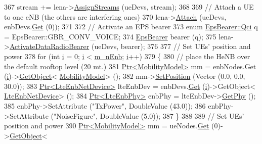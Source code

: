 \begin{DoxyCode}
367   stream += lena->\hyperlink{classns3_1_1LteHelper_ae90d941582aa49a1b28c9301ece35b07}{AssignStreams} (ueDevs, stream);
368   
369   \textcolor{comment}{// Attach a UE to one eNB (the others are interfering ones)}
370   lena->\hyperlink{classns3_1_1LteHelper_a9466743f826aa2652a87907b7f0a1c87}{Attach} (ueDevs, enbDevs.\hyperlink{classns3_1_1NetDeviceContainer_a677d62594b5c9d2dea155cc5045f4d0b}{Get} (0));
371   
372   \textcolor{comment}{// Activate an EPS bearer}
373   \textcolor{keyword}{enum} \hyperlink{structns3_1_1EpsBearer_aecf0c67109c5eb4ec0b07226fff5885e}{EpsBearer::Qci} q = EpsBearer::GBR\_CONV\_VOICE;
374   \hyperlink{structns3_1_1EpsBearer}{EpsBearer} bearer (q);
375   lena->\hyperlink{classns3_1_1LteHelper_ac896e16cf162e4beeaa292d39ab1b700}{ActivateDataRadioBearer} (ueDevs, bearer);
376   
377   \textcolor{comment}{// Set UEs' position and power}
378   \textcolor{keywordflow}{for} (\textcolor{keywordtype}{int} \hyperlink{bernuolliDistribution_8m_a6f6ccfcf58b31cb6412107d9d5281426}{i} = 0; \hyperlink{bernuolliDistribution_8m_a6f6ccfcf58b31cb6412107d9d5281426}{i} < \hyperlink{classLenaDlCtrlPhyErrorModelTestCase_a761b34bd4869ebf6d1a5bd78da392fbb}{m\_nEnb}; \hyperlink{bernuolliDistribution_8m_a6f6ccfcf58b31cb6412107d9d5281426}{i}++)
379     \{
380       \textcolor{comment}{// place the HeNB over the default rooftop level (20 mt.)}
381       \hyperlink{classns3_1_1Ptr}{Ptr<MobilityModel>} mm = enbNodes.Get (\hyperlink{bernuolliDistribution_8m_a6f6ccfcf58b31cb6412107d9d5281426}{i})->\hyperlink{classns3_1_1Object_a13e18c00017096c8381eb651d5bd0783}{GetObject}<
      \hyperlink{classns3_1_1MobilityModel}{MobilityModel}> ();
382       mm->\hyperlink{classns3_1_1MobilityModel_ac584b3d5a309709d2f13ed6ada1e7640}{SetPosition} (Vector (0.0, 0.0, 30.0));
383       \hyperlink{classns3_1_1Ptr}{Ptr<LteEnbNetDevice>} lteEnbDev = enbDevs.\hyperlink{classns3_1_1NetDeviceContainer_a677d62594b5c9d2dea155cc5045f4d0b}{Get} (\hyperlink{bernuolliDistribution_8m_a6f6ccfcf58b31cb6412107d9d5281426}{i})->GetObject<
      \hyperlink{classns3_1_1LteEnbNetDevice}{LteEnbNetDevice}> ();
384       \hyperlink{classns3_1_1Ptr}{Ptr<LteEnbPhy>} enbPhy = lteEnbDev->\hyperlink{classns3_1_1LteEnbNetDevice_a58db72130e0740f16a5e03b22e4a10a4}{GetPhy} ();
385       enbPhy->SetAttribute (\textcolor{stringliteral}{"TxPower"}, DoubleValue (43.0));
386       enbPhy->SetAttribute (\textcolor{stringliteral}{"NoiseFigure"}, DoubleValue (5.0));
387     \}
388   
389   \textcolor{comment}{// Set UEs' position and power}
390   \hyperlink{classns3_1_1Ptr}{Ptr<MobilityModel>} mm = ueNodes.\hyperlink{classns3_1_1NodeContainer_a9ed96e2ecc22e0f5a3d4842eb9bf90bf}{Get} (0)->\hyperlink{classns3_1_1Object_a13e18c00017096c8381eb651d5bd0783}{GetObject}<

\end{DoxyCode}
